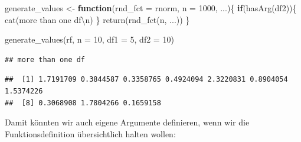 \documentclass[
]{book}
\newenvironment{Shaded}{\begin{snugshade}}{\end{snugshade}}
\newcommand{\AttributeTok}[1]{\textcolor[rgb]{0.77,0.63,0.00}{#1}}
\newcommand{\ControlFlowTok}[1]{\textcolor[rgb]{0.13,0.29,0.53}{\textbf{#1}}}
\newcommand{\DecValTok}[1]{\textcolor[rgb]{0.00,0.00,0.81}{#1}}
\newcommand{\FunctionTok}[1]{\textcolor[rgb]{0.00,0.00,0.00}{#1}}
\newcommand{\NormalTok}[1]{#1}
\newcommand{\OtherTok}[1]{\textcolor[rgb]{0.56,0.35,0.01}{#1}}
\newcommand{\SpecialCharTok}[1]{\textcolor[rgb]{0.00,0.00,0.00}{#1}}
\newcommand{\StringTok}[1]{\textcolor[rgb]{0.31,0.60,0.02}{#1}}
\begin{document}
\begin{Shaded}
\begin{Highlighting}[]
\NormalTok{generate\_values }\OtherTok{\textless{}{-}} \ControlFlowTok{function}\NormalTok{(}\AttributeTok{rnd\_fct =}\NormalTok{ rnorm,}
                            \AttributeTok{n =} \DecValTok{1000}\NormalTok{,}
\NormalTok{                            ...)\{}
  \ControlFlowTok{if}\NormalTok{(}\FunctionTok{hasArg}\NormalTok{(df2))\{}
    \FunctionTok{cat}\NormalTok{(}\StringTok{\textquotesingle{}more than one df}\SpecialCharTok{\textbackslash{}n}\StringTok{\textquotesingle{}}\NormalTok{)}
\NormalTok{  \}}
  \FunctionTok{return}\NormalTok{(}\FunctionTok{rnd\_fct}\NormalTok{(n, ...))}
\NormalTok{\}}

\FunctionTok{generate\_values}\NormalTok{(rf, }\AttributeTok{n =} \DecValTok{10}\NormalTok{, }\AttributeTok{df1 =} \DecValTok{5}\NormalTok{, }\AttributeTok{df2 =} \DecValTok{10}\NormalTok{)}
\end{Highlighting}
\end{Shaded}

\begin{verbatim}
## more than one df
\end{verbatim}

\begin{verbatim}
##  [1] 1.7191709 0.3844587 0.3358765 0.4924094 2.3220831 0.8904054 1.5374226
##  [8] 0.3068908 1.7804266 0.1659158
\end{verbatim}

Damit könnten wir auch eigene Argumente definieren, wenn wir die Funktionsdefinition übersichtlich halten wollen:
\end{document}
